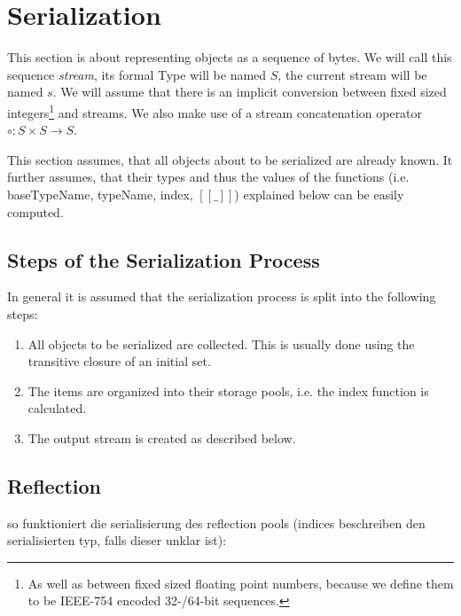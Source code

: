 \documentclass[a4paper,10pt]{article}
\newcommand{\den}[1]{\ensuremath{[\![#1]\!]}}
\begin{document}
\section{Serialization}
\label{serialization}

This section is about representing objects as a sequence of bytes. We will call this sequence \textit{stream}, its formal Type will be named $S$, the current stream will be named $s$. We will assume that there is an implicit conversion between fixed sized integers\footnote{As well as between fixed sized floating point numbers, because we define them to be IEEE-754 encoded 32-/64-bit sequences.} and streams. We also make use of a stream concatenation operator $\circ : S \times S → S$.

This section assumes, that all objects about to be serialized are already known. It further assumes, that their types and thus the values of the functions (i.e. baseTypeName, typeName, index, $\den{\_}$) explained below can be easily computed.


\subsection{Steps of the Serialization Process}

In general it is assumed that the serialization process is split into the following steps:
\begin{enumerate}
 \item All objects to be serialized are collected. This is usually done using the transitive closure of an initial set.
 
 \item The items are organized into their storage pools, i.e. the index function is calculated.
 
 \item The output stream is created as described below.
\end{enumerate}

\subsection{Reflection}

so funktioniert die serialisierung des reflection pools (indices beschreiben den serialisierten typ, falls dieser unklar ist):
\end{document}
